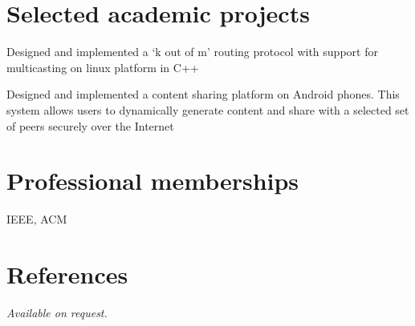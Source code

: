 \documentclass[margin,line]{resume}
\begin{document}
\begin{resume}
\section{\mysidestyle Selected academic projects}
\begin{list2}
	\item Designed and implemented a `k out of m' routing protocol with support for multicasting on linux platform in C++
	\item Designed and implemented a content sharing platform on Android phones. This system allows users to dynamically generate content and share with a selected set of peers securely over the Internet
\end{list2}

\section{\mysidestyle Professional memberships}
IEEE, ACM

\section{\mysidestyle References} 
 \sl Available on request.




\end{resume}
\end{document}
